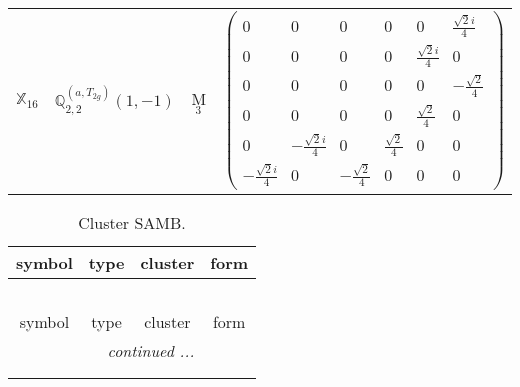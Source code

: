 \documentclass[fleqn,10pt,landscape]{article}
\begin{document}
\begin{itemize}
\begin{center}
\begin{longtable}{c|c|c|c}
$ \mathbb{X}_{16} $ & $\mathbb{Q}_{2,2}^{(a,T_{2g})}(1,-1)$ & M$_{3}$ & $\begin{pmatrix} 0 & 0 & 0 & 0 & 0 & \frac{\sqrt{2} i}{4} \\ 0 & 0 & 0 & 0 & \frac{\sqrt{2} i}{4} & 0 \\ 0 & 0 & 0 & 0 & 0 & - \frac{\sqrt{2}}{4} \\ 0 & 0 & 0 & 0 & \frac{\sqrt{2}}{4} & 0 \\ 0 & - \frac{\sqrt{2} i}{4} & 0 & \frac{\sqrt{2}}{4} & 0 & 0 \\ - \frac{\sqrt{2} i}{4} & 0 & - \frac{\sqrt{2}}{4} & 0 & 0 & 0 \end{pmatrix}$ \\
\end{longtable}
\end{center}
\begin{center}
\renewcommand{\arraystretch}{1.3}
\begin{longtable}{c|c|c|c}
\caption{Cluster SAMB.}
 \\
 \hline \hline
symbol & type & cluster & form \\ \hline \endfirsthead

\multicolumn{3}{l}{\tablename\ \thetable{}} \\
 \hline \hline
symbol & type & cluster & form \\ \hline \endhead

 \hline \hline
\multicolumn{3}{r}{\footnotesize\it continued ...} \\ \endfoot

 \hline \hline
\multicolumn{3}{r}{} \\ \endlastfoot


\end{longtable}
\end{center}
\end{itemize}
\end{document}
